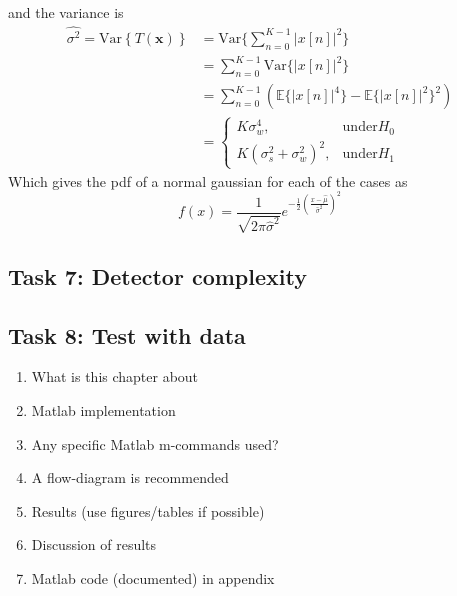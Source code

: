 and the variance is
\begin{align}
    \hat{\sigma^2} = \mathrm{Var}\left\{T(\mathbf{x})\right\} & = \mathrm{Var}\{\sum_{n=0}^{K-1}|x[n]|^2\}\nonumber\\
    & = \sum_{n=0}^{K-1}\mathrm{Var}\{|x[n]|^2\}\nonumber\\
    & = \sum_{n=0}^{K-1}(\mathbb{E}\{|x[n]|^4\}-\mathbb{E}\{|x[n]|^2\}^2\nonumber)\\
    & = \begin{cases}
    K\sigma_w^4, & \text{under} H_0\\
    K(\sigma_s^2+\sigma_w^2)^2, & \text{under} H_1
    \end{cases}
\end{align}
Which gives the pdf of a normal gaussian for each of the cases as
\begin{equation}
    f(x) = \frac{1}{\sqrt{2\pi\hat{\sigma}^2}}e^{-\frac{1}{2}\left(\frac{x-\hat{\mu}}{\hat{\sigma}^2}\right)^2}
\end{equation}







\subsection{Task 7: Detector complexity}

\subsection{Task 8: Test with data}

\begin{enumerate}[i]
    \item What is this chapter about
    \item Matlab implementation
    \item Any specific Matlab m-commands used?
    \item A flow-diagram is recommended
    \item Results (use figures/tables if possible)
    \item Discussion of results
    \item Matlab code (documented) in appendix
\end{enumerate}





